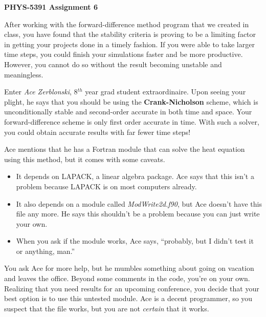\documentclass[12pt, letterpaper]{article}
\begin{document}
\begin{center}
  {\LARGE \textbf{PHYS-5391 Assignment 6}}\\
\end{center}

After working with the forward-difference method program that we created
in class, you have found that the stability criteria is proving to be a
limiting factor in getting your projects done in a timely fashion.  If you
were able to take larger time steps, you could finish your simulations faster
and be more productive.  However, you cannot do so without the result
becoming unstable and meaningless.

Enter \emph{Ace Zerblonski}, 8$^{th}$ year grad student extraordinaire.  Upon
seeing your plight, he says that you should be using the 
\textbf{Crank-Nicholson} scheme, which is unconditionally stable and 
second-order accurate in both time and space.  Your forward-difference scheme
is only first order accurate in time.  With such a solver, you could obtain
accurate results with far fewer time steps!

Ace mentions that he has a Fortran module that can solve the heat equation
using this method, but it comes with some caveats.
\begin{itemize}
  \item It depends on LAPACK, a linear algebra package.  Ace says that this
    isn't a problem because LAPACK is on most computers already.
  \item It also depends on a module called \textit{ModWrite2d.f90}, but
    Ace doesn't have this file any more.  He says this shouldn't be a problem
    because you can just write your own.
  \item When you ask if the module works, Ace says, ``probably, but I didn't
    test it or anything, man.''  
\end{itemize}

You ask Ace for more help, but he mumbles something about going on vacation
and leaves the office.  
Beyond some comments in the code, you're on your own.
Realizing that you need results for an upcoming
conference, you decide that your best option is to use this untested 
module.  Ace is a decent programmer, so you suspect that the file works, but
you are not \emph{certain} that it works.  
\end{document}
